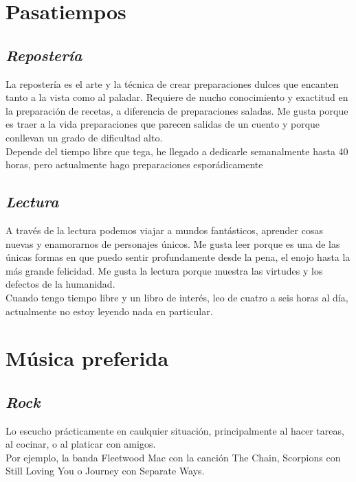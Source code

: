 \documentclass[letterpaper,12pt]{article}
\begin{document}
\section{\Huge{Pasatiempos}}

     \subsection{\textit{\Large{Repostería}}}
     \small{La repostería es el arte y la técnica de crear preparaciones dulces que encanten tanto a la vista como al paladar. Requiere de mucho conocimiento y exactitud en la preparación de recetas, a diferencia de preparaciones saladas. Me gusta porque es traer a la vida preparaciones que parecen salidas de un cuento y porque conllevan un grado de dificultad alto.}\\
     \small{Depende del tiempo libre que tega, he llegado a dedicarle semanalmente hasta 40 horas, pero actualmente hago preparaciones esporádicamente}
     
     \subsection{\textit{\Large{Lectura}}}
     \small{A través de la lectura podemos viajar a mundos fantásticos, aprender cosas nuevas y enamorarnos de personajes únicos. Me gusta leer porque es una de las únicas formas en que puedo sentir profundamente desde la pena, el enojo hasta la más grande felicidad. Me gusta la lectura porque muestra las virtudes y los defectos de la humanidad.}\\
     \small{Cuando tengo tiempo libre y un libro de interés, leo de cuatro a seis horas al día, actualmente no estoy leyendo nada en particular.}
     
\section{\Huge{Música preferida}}

     \subsection{\textit{\Large{Rock}}}
     \small{Lo escucho prácticamente en caulquier situación, principalmente al hacer tareas, al cocinar, o al platicar con amigos.}\\
      \small{Por ejemplo, la banda Fleetwood Mac con la canción The Chain, Scorpions con Still Loving You o Journey con Separate Ways.}
      
\end{document}
